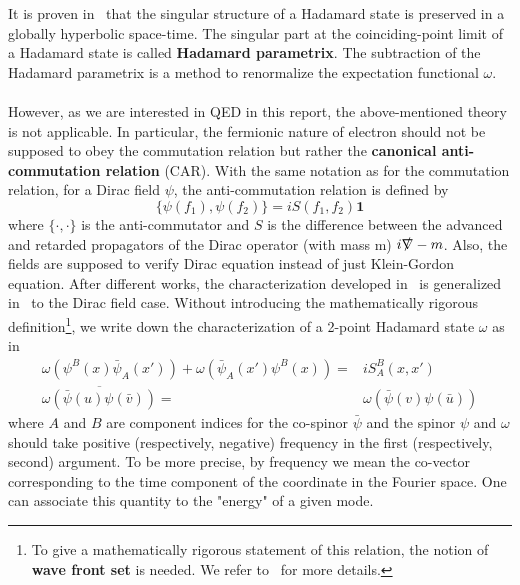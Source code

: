 It is proven in~\cite{Fulling1978} that the singular structure of a Hadamard state is preserved in a globally hyperbolic space-time. 
The singular part at the coinciding-point limit of a Hadamard state is called \textbf{Hadamard parametrix}.
The subtraction of the Hadamard parametrix is a method to renormalize the expectation functional $\omega$. \\\\
%
However, as we are interested in QED in this report, the above-mentioned theory is not applicable. 
In particular, the fermionic nature of electron should not be supposed to obey the commutation relation but rather the \textbf{canonical anti-commutation relation} (CAR).
With the same notation as for the commutation relation, 
for a Dirac field $\psi$, the anti-commutation relation is defined by
\begin{equation*}
\{\psi(f_1), \psi(f_2)\} = i S(f_1, f_2) \mathbf{1}
\end{equation*}
where $\{\cdot, \cdot\}$ is the anti-commutator and $S$ is the difference between the advanced and retarded propagators of the Dirac operator (with mass m) $i\slashed{\nabla} - m$.
Also, the fields are supposed to verify Dirac equation instead of just Klein-Gordon equation.
After different works, the characterization developed in~\cite{Radzikowski1996} is generalized in~\cite{Sahlmann2000} to the Dirac field case.
Without introducing the mathematically rigorous definition\footnote{
To give a mathematically rigorous statement of this relation, 
the notion of \textbf{wave front set} is needed. 
We refer to~\cite{Radzikowski1996} for more details.
}, 
we write down the characterization of a 2-point Hadamard state $\omega$ as in~\cite{Zahn2015}
\begin{equation}\label{vacuum-hadamardcond}
\begin{split}
\omega(\psi^B(x)\bar{\psi}_A(x')) + \omega(\bar{\psi}_A(x')\psi^B(x)) = &
iS^B_A(x,x') \\
\overline{\omega(\bar{\psi}(u)\psi(\bar{v}))} = & \omega(\bar{\psi}(v)\psi(\bar{u}))
\end{split}
\end{equation}
where $A$ and $B$ are component indices for the co-spinor $\bar{\psi}$ and the spinor $\psi$ and $\omega$ should take positive (respectively, negative) frequency in the first (respectively, second) argument.
To be more precise, 
by frequency we mean the co-vector corresponding to the time component of the coordinate in the Fourier space.
One can associate this quantity to the "energy" of a given mode. 
